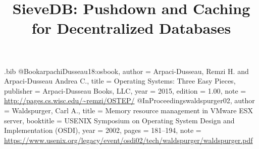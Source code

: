 \newcommand{\cmark}{\ding{51}}
\newcommand{\xmark}{\ding{55}}

\begin{filecontents}{\jobname.bib}
@Book{arpachiDusseau18:osbook,
  author =       {Arpaci-Dusseau, Remzi H. and Arpaci-Dusseau Andrea C.},
  title =        {Operating Systems: Three Easy Pieces},
  publisher =    {Arpaci-Dusseau Books, LLC},
  year =         2015,
  edition =      {1.00},
  note =         {\url{http://pages.cs.wisc.edu/~remzi/OSTEP/}}
}
@InProceedings{waldspurger02,
  author =       {Waldspurger, Carl A.},
  title =        {Memory resource management in {VMware ESX} server},
  booktitle =    {USENIX Symposium on Operating System Design and
                  Implementation (OSDI)},
  year =         2002,
  pages =        {181--194},
  note =         {\url{https://www.usenix.org/legacy/event/osdi02/tech/waldspurger/waldspurger.pdf}}}
\end{filecontents}

\newcommand{\showkot}[1]{ {\color{red}{#1}}}
\newcommand{\ours}{SieveDB}


\date{}

\title{\Large \bf \ours : Pushdown and Caching for Decentralized Databases}


\maketitle

\begin{abstract}
\showkot{Write later.}
\end{abstract}



